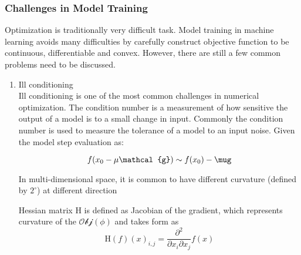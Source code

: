 \subsubsection{Challenges in Model Training}

Optimization is traditionally very difficult task. Model training in machine learning avoids many difficulties by carefully construct objective function to be continuous, differentiable and convex. However, there are still a few common problems need to be discussed. 

\begin{enumerate}
    \item Ill conditioning\\
Ill conditioning is one of the most common challenges in numerical optimization. The condition number is a measurement of how sensitive the output of a model is to a small change in input. Commonly the condition number is used to measure the tolerance of a model to an input noise.  Given the model step evaluation as:

\begin{equation}
    f(x_0-\mu\mathcal{g}) \sim f(x_0) - \mug
\end{equation}

In multi-dimensional space, it is common to have different curvature (defined by $2^\circ$) at different direction 

Hessian matrix $\mathrm{H}$ is defined as Jacobian of the gradient, which represents curvature of the $\mathcal{Obj}(\phi)$ and takes form as 
\begin{equation}
    \mathrm{H}(f)(x)_{i,j} = \frac{\partial^2}{\partial x_i \partial x_j}f(x)
\end{equation}


\end{enumerate}
